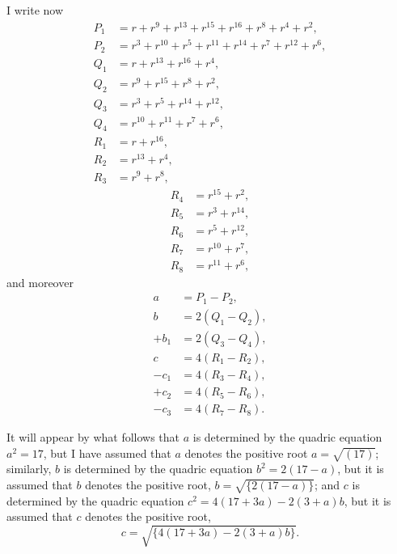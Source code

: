 \documentclass[11pt,a4paper]{article}
\begin{document}
I write now
\begin{align*}
P_1 &= r + r^9 + r^{13} + r^{15} + r^{16} + r^8 + r^4 + r^2,\\
P_2 &= r^3 + r^{10} + r^5 + r^{11} + r^{14} + r^7 + r^{12} + r^6,\\
Q_1 &= r + r^{13} + r^{16} + r^4,\\
Q_2 &= r^9 + r^{15} + r^8 + r^2,\\
Q_3 &= r^3 + r^5 + r^{14} + r^{12},\\
Q_4 &= r^{10} + r^{11} + r^7 + r^6,\\
R_1 &= r + r^{16},\\
R_2 &= r^{13} + r^4,\\
R_3 &= r^9 + r^8,
\end{align*}
\clearpage
\noindent
\begin{align*}
R_4 &= r^{15} + r^2,\\
R_5 &= r^3 + r^{14},\\
R_6 &= r^5 + r^{12},\\
R_7 &= r^{10} + r^7,\\
R_8 &= r^{11} + r^6,
\end{align*}
and moreover
\begin{align*}
a &= P_1 - P_2,\\
b &= 2(Q_1 - Q_2),\\
+ b_1 &= 2(Q_3 - Q_4),\\
c &= 4(R_1 - R_2),\\
- c_1 &= 4(R_3 - R_4),\\
+ c_2 &= 4(R_5 - R_6),\\
- c_3 &= 4(R_7 - R_8).
\end{align*}

It will appear by what follows that $a$ is determined by the quadric equation $a^2 = 17$, but I have assumed that $a$ denotes the positive root $a = \sqrt{(17)}$; similarly, $b$ is determined by the quadric equation $b^2 = 2(17 - a)$, but it is assumed that $b$ denotes the positive root, $b = \sqrt{\{2(17 - a)\}}$; and $c$ is determined by the quadric equation $c^2 = 4(17 + 3a) - 2(3 + a)b$, but it is assumed that $c$ denotes the positive root,
\[
c = \sqrt{\{4(17 + 3a) - 2(3 + a)b\}}.
\]
\end{document}
